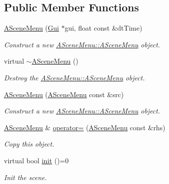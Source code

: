 \subsection*{Public Member Functions}
\begin{DoxyCompactItemize}
\item 
\hyperlink{class_a_scene_menu_a97a8137c54f33e8f08adde2c2bb604c6}{A\+Scene\+Menu} (\hyperlink{class_gui}{Gui} $\ast$gui, float const \&dt\+Time)
\begin{DoxyCompactList}\small\item\em Construct a new \hyperlink{class_a_scene_menu_a97a8137c54f33e8f08adde2c2bb604c6}{A\+Scene\+Menu\+::\+A\+Scene\+Menu} object. \end{DoxyCompactList}\item 
\mbox{\label{class_a_scene_menu_a2f1cb1b10b6c68b8d27269d31c35eb61}} 
virtual \hyperlink{class_a_scene_menu_a2f1cb1b10b6c68b8d27269d31c35eb61}{$\sim$\+A\+Scene\+Menu} ()
\begin{DoxyCompactList}\small\item\em Destroy the \hyperlink{class_a_scene_menu_a97a8137c54f33e8f08adde2c2bb604c6}{A\+Scene\+Menu\+::\+A\+Scene\+Menu} object. \end{DoxyCompactList}\item 
\hyperlink{class_a_scene_menu_a9962aa28c98e9471256c494563457f4b}{A\+Scene\+Menu} (\hyperlink{class_a_scene_menu}{A\+Scene\+Menu} const \&src)
\begin{DoxyCompactList}\small\item\em Construct a new \hyperlink{class_a_scene_menu_a97a8137c54f33e8f08adde2c2bb604c6}{A\+Scene\+Menu\+::\+A\+Scene\+Menu} object. \end{DoxyCompactList}\item 
\hyperlink{class_a_scene_menu}{A\+Scene\+Menu} \& \hyperlink{class_a_scene_menu_a3e4fc24a1fb0bcd6296f4856a2e3c611}{operator=} (\hyperlink{class_a_scene_menu}{A\+Scene\+Menu} const \&rhs)
\begin{DoxyCompactList}\small\item\em Copy this object. \end{DoxyCompactList}\item 
virtual bool \hyperlink{class_a_scene_menu_a78bdee98bd7df224524586a060f9bdec}{init} ()=0
\begin{DoxyCompactList}\small\item\em Init the scene. \end{DoxyCompactList}\item 

\end{DoxyCompactItemize}
